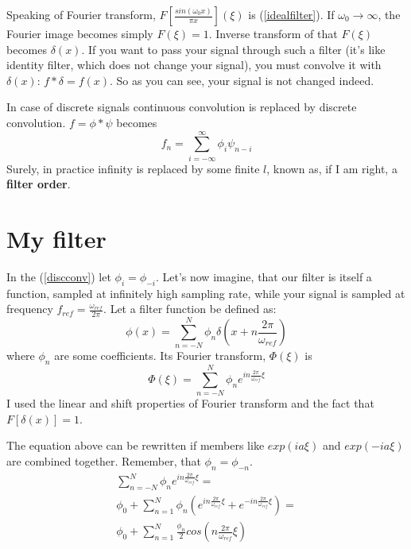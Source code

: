\documentclass[a4paper,11pt,fleqn]{article}
\let\oldref\ref
\renewcommand{\ref}[1]{(\oldref{#1})}
\begin{document}
Speaking of Fourier transform, $F[\frac{sin (\omega_{0} x)}{\pi x}](\xi)$ is \ref{idealfilter}. If $\omega_{0} \to \infty$, the Fourier image becomes simply $F(\xi) = 1$. Inverse
transform of that $F(\xi)$ becomes $\delta(x)$. If you want to pass your signal through such a filter (it's like identity filter, which does not change your signal), you must
convolve it with $\delta(x)$: $f*\delta = f(x)$. So as you can see, your signal is not changed indeed.

In case of discrete signals continuous convolution is replaced by discrete convolution. $f = \phi*\psi$ becomes
\begin{equation}
\label{discconv}
f_{n} = \sum_{i=-\infty}^{\infty}\phi_{i}\psi_{n-i}
\end{equation}
Surely, in practice infinity is replaced by some finite $l$, known as, if I am right, a \textbf{filter order}.

\section{My filter}
In the \ref{discconv} let $\phi_{i} = \phi_{-i}$. Let's now imagine, that our filter is itself a function, sampled at infinitely high sampling rate, while your signal is sampled at frequency
$f_{ref}=\frac{\omega_{ref}}{2 \pi}$. Let a filter function be defined as:
\begin{equation}
\phi(x) = \sum_{n=-N}^{N} \phi_{n} \delta(x+n \frac{2 \pi}{\omega_{ref}})
\end{equation}
where $\phi_{n}$ are some coefficients. Its Fourier transform, $\Phi(\xi)$ is
\begin{equation}
\Phi(\xi) = \sum_{n=-N}^{N} \phi_{n} e^{i n \frac{2 \pi}{\omega_{ref}} \xi}
\end{equation}
I used the linear and shift properties of Fourier transform and the fact that $F[\delta(x)] = 1$.

The equation above can be rewritten if members like $exp(ia\xi)$ and $exp(-ia\xi)$ are combined together. Remember, that $\phi_{n} = \phi_{-n}$.
\begin{equation}
\begin{aligned}
\sum_{n=-N}^{N} \phi_{n} e^{i n \frac{2 \pi}{\omega_{ref}} \xi} = \\
\phi_{0} + \sum_{n=1}^{N} \phi_{n} (e^{i n \frac{2 \pi}{\omega_{ref}} \xi} + e^{-i n \frac{2 \pi}{\omega_{ref}} \xi}) = \\
\phi_{0} + \sum_{n=1}^{N} \frac{\phi_{n}}{2} cos(n \frac{2 \pi}{\omega_{ref}} \xi)
\end{aligned}
\end{equation}
\end{document}
